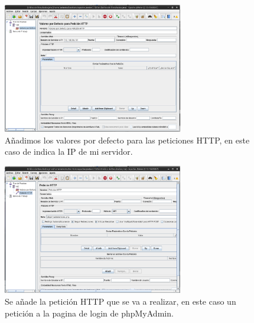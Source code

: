 \begin{figure}[H]
  \begin{center}
    \includegraphics[width=0.7\textwidth]{imagenes/jm2}
    \caption{Añadimos los valores por defecto para las peticiones HTTP, en este caso de indica la IP de mi servidor.}
    \label{fig8}
  \end{center}
\end{figure}

\begin{figure}[H]
  \begin{center}
    \includegraphics[width=0.7\textwidth]{imagenes/jm3}
    \caption{Se añade la petición HTTP que se va a realizar, en este caso un petición a la pagina de login de phpMyAdmin.}
    \label{fig9}
  \end{center}
\end{figure}

